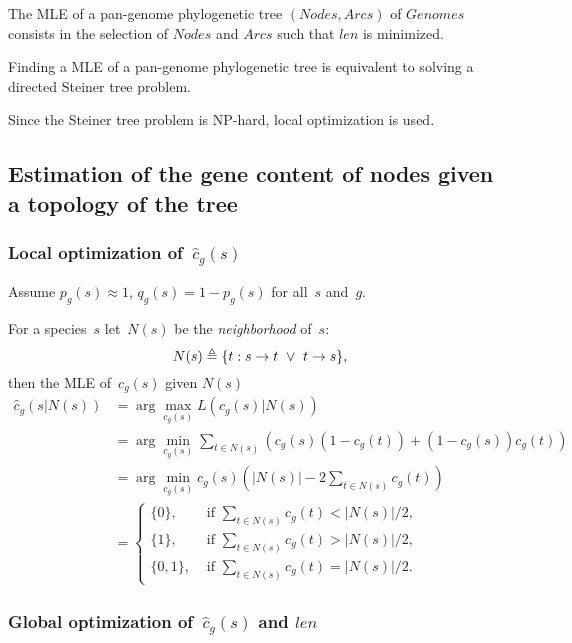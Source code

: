 \documentclass[10pt,a4paper]{article}
\theoremstyle{plain} \newtheorem{Lem}{Lemma}
\begin{document}
The MLE of a pan-genome phylogenetic tree $(Nodes,Arcs)$ of $Genomes$ consists in
the selection of $Nodes$ and $Arcs$
such that $len$ is minimized.

Finding a MLE of a pan-genome phylogenetic tree is equivalent to solving a directed Steiner tree problem.

Since the Steiner tree problem is NP-hard, local optimization is used.




\subsection {Estimation of the gene content of nodes given a topology of the tree}


\subsubsection{Local optimization of~$\hat c_g(s)$}

Assume $p_g(s) \approx 1$, $q_g(s) = 1 - p_g(s)$ for all~$s$ and~$g$.

For a species~$s$ let~$N(s)$ be the {\em neighborhood} of~$s$:
$$ N(s) \triangleq \{t: s \to t \ \vee \  t \to s\}, $$
then
the MLE of~$c_g(s)$ given $N(s)$
\begin{equation*}
\begin{split}
\hat c_g(s|N(s)) &= \arg \max_{c_g(s)} L(c_g(s)|N(s)) \\
   &= \arg \min_{c_g(s)} \sum_{t \in N(s)} (c_g(s) (1-c_g(t)) + (1-c_g(s)) c_g(t)) \\
   &= \arg \min_{c_g(s)} c_g(s) \left(|N(s)| - 2 \sum_{t \in N(s)} c_g(t) \right) \\
   &=
  \begin{cases}
    \{0\},   &\text{ if } \sum_{t \in N(s)} c_g(t) < |N(s)|/2,\\
    \{1\},   &\text{ if } \sum_{t \in N(s)} c_g(t) > |N(s)|/2,\\
    \{0,1\}, &\text{ if } \sum_{t \in N(s)} c_g(t) = |N(s)|/2.
  \end{cases}
\end{split}
\end{equation*}



\subsubsection{Global optimization of~$\hat c_g(s)$ and $len$}
\end{document}
